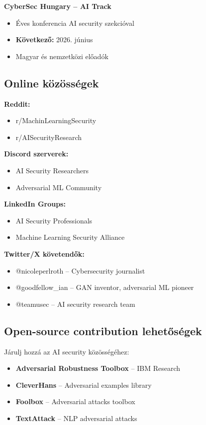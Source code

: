 \documentclass{../templates/magazine}
\begin{document}
\textbf{CyberSec Hungary -- AI Track}
\begin{itemize}
    \item Éves konferencia AI security szekcióval
    \item \textbf{Következő:} 2026. június
    \item Magyar és nemzetközi előadók
\end{itemize}

\subsection{Online közösségek}

\textbf{Reddit:}
\begin{itemize}
    \item r/MachinLearningSecurity
    \item r/AISecurityResearch
\end{itemize}

\textbf{Discord szerverek:}
\begin{itemize}
    \item AI Security Researchers
    \item Adversarial ML Community
\end{itemize}

\textbf{LinkedIn Groups:}
\begin{itemize}
    \item AI Security Professionals
    \item Machine Learning Security Alliance
\end{itemize}

\textbf{Twitter/X követendők:}
\begin{itemize}
    \item @nicoleperlroth -- Cybersecurity journalist
    \item @goodfellow\_ian -- GAN inventor, adversarial ML pioneer
    \item @teamusec -- AI security research team
\end{itemize}

\subsection{Open-source contribution lehetőségek}

Járulj hozzá az AI security közösségéhez:

\begin{itemize}
    \item \textbf{Adversarial Robustness Toolbox} -- IBM Research
    \item \textbf{CleverHans} -- Adversarial examples library
    \item \textbf{Foolbox} -- Adversarial attacks toolbox
    \item \textbf{TextAttack} -- NLP adversarial attacks
\end{itemize}
\end{document}
